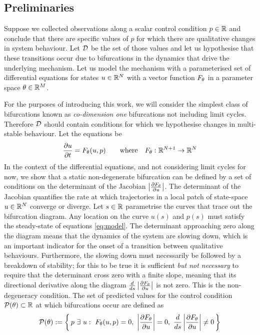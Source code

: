 \documentclass{article}
\begin{document}
\subsection{Preliminaries}

Suppose we collected observations along a scalar control condition $p\in\mathbb{R}$ and conclude that there are specific values of $p$ for which there are qualitative changes in system behaviour. Let $\mathcal{D}$ be the set of those values and let us hypothesise that these transitions occur due to bifurcations in the dynamics that drive the underlying mechanism. Let us model the mechanism with a parameterised set of differential equations for states $u\in\mathbb{R}^N$ with a vector function $F_{\theta}$ in a parameter space $\theta\in\mathbb{R}^M$.

For the purposes of introducing this work, we will consider the simplest class of bifurcations known as \textit{co-dimension one} bifurcations not including limit cycles. Therefore $\mathcal{D}$ should contain conditions for which we hypothesise changes in multi-stable behaviour. Let the equations be
\begin{align}
	\frac{\partial u}{\partial t}=F_{\theta}(u,p)
	\qquad\mathrm{where}\quad
	F_{\theta} : \mathbb{R}^{N+1}\rightarrow\mathbb{R}^N
	\label{eq:model}
\end{align}
In the context of the differential equations, and not considering limit cycles for now, we show that a static non-degenerate bifurcation can be defined by a set of conditions on the determinant of the Jacobian $\left| \frac{\partial F_{\theta}}{\partial u} \right|$. The determinant of the Jacobian quantifies the rate at which trajectories in a local patch of state-space $u\in\mathbb{R}^N$ converge or diverge. Let $s\in\mathbb{R}$ parametrise the curves that trace out the bifurcation diagram. Any location on the curve $u(s)$ and $p(s)$ must satisfy the steady-state of equations \eqref{eq:model}. The determinant approaching zero along the diagram means that the dynamics of the system are slowing down, which is an important indicator for the onset of a transition between qualitative behaviours. Furthermore, the slowing down must necessarily be followed by a breakdown of stability; for this to be true it is sufficient \textit{but not necessary} to require that the determinant cross zero with a finite slope, meaning that its directional derivative along the diagram $\frac{d}{ds}\left| \frac{\partial F_{\theta}}{\partial u} \right|$ is not zero. This is the non-degeneracy condition. The set of predicted values for the control condition $\mathcal{P}(\theta)\subset\mathbb{R}$ at which bifurcations occur are defined as
\begin{align}
	\mathcal{P}(\theta):=\left\{\,
	p\,\,\exists\,\,u:\,\,F_{\theta}(u,p)=0,\,\,\left| \frac{\partial F_{\theta}}{\partial u} \right|=0,
	\,\, \frac{d}{ds}\left| \frac{\partial F_{\theta}}{\partial u} \right|\neq0
	\,\right\}
	\label{eq:predictions}
\end{align}
\end{document}
